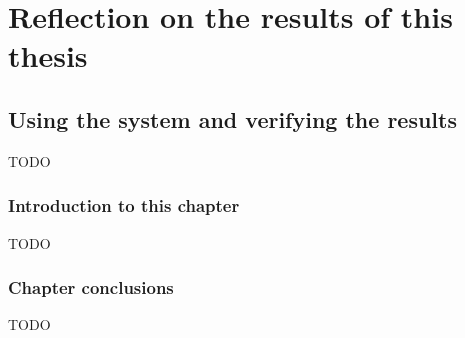 


\part{Reflection on the results of this thesis}
\label{part:reflection}

\chapter{Using the system and verifying the results}
\label{ch:evaluation}
TODO

\section{Introduction to this chapter}
\label{sec:evaluation_introduction}

TODO

\section{Chapter conclusions}
\label{sec:evaluation_conclusions}

TODO
